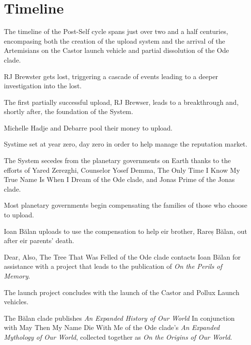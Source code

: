 \section*{Timeline}

The timeline of the Post-Self cycle spans just over two and a half centuries, encompasing both the creation of the upload system and the arrival of the Artemisians on the Castor launch vehicle and partial dissolution of the Ode clade.

\begin{description}
\tightlist
\item[\emph{2112 --- December 7}]
RJ Brewster gets lost, triggering a cascade of events leading to a deeper investigation into the lost.
\item[\emph{2115 --- February ??}]
The first partially successful upload, RJ Brewser, leads to a breakthrough and, shortly after, the foundation of the System.
\item[\emph{2117 --- ???}]
Michelle Hadje and Debarre pool their money to upload.
\item[\emph{2124 --- January 1}]
Systime set at year zero, day zero in order to help manage the reputation market.
\item[\emph{2125 --- January 21}]
The System secedes from the planetary governments on Earth thanks to the efforts of Yared Zerezghi, Counselor Yosef Demma, The Only Time I Know My True Name Is When I Dream of the Ode clade, and Jonas Prime of the Jonas clade.
\item[\emph{2170 --- Throughout the year}]
Most planetary governments begin compensating the families of those who choose to upload.
\item[\emph{2238 --- July 28}]
Ioan Bălan uploads to use the compensation to help eir brother, Rareș Bălan, out after eir parents' death.
\item[\emph{2305 --- November 8}]
Dear, Also, The Tree That Was Felled of the Ode clade contacts Ioan Bălan for assistance with a project that leads to the publication of \emph{On the Perils of Memory}.
\item[\emph{2325 --- January 21}]
The launch project concludes with the launch of the Castor and Pollux Launch vehicles.
\item[\emph{2326 --- October 30}]
The Bălan clade publishes \emph{An Expanded History of Our World} In conjunction with May Then My Name Die With Me of the Ode clade's \emph{An Expanded Mythology of Our World}, collected together as \emph{On the Origins of Our World}.

\end{description}
